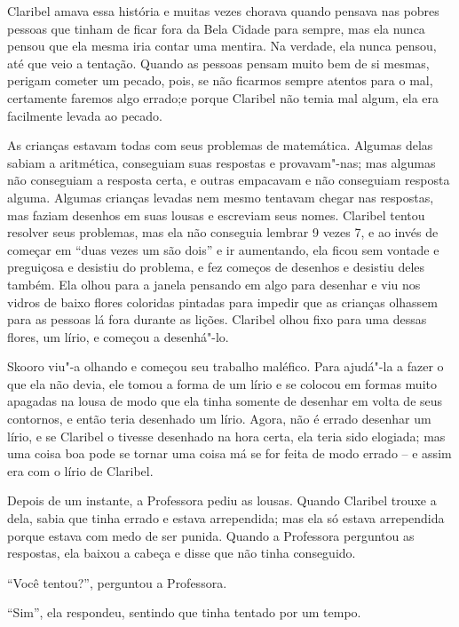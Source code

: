 Claribel amava essa história e muitas vezes chorava quando pensava nas
pobres pessoas que tinham de ficar fora da Bela Cidade para sempre, mas
ela nunca pensou que ela mesma iria contar uma mentira. Na verdade, ela
nunca pensou, até que veio a tentação. Quando as pessoas pensam muito
bem de si mesmas, perigam cometer um pecado, pois, se não ficarmos
sempre atentos para o mal, certamente faremos algo errado;e porque
Claribel não temia mal algum, ela era facilmente levada ao pecado.

As crianças estavam todas com seus problemas de matemática. Algumas
delas sabiam a aritmética, conseguiam suas respostas e provavam"-nas; mas
algumas não conseguiam a resposta certa, e outras empacavam e não
conseguiam resposta alguma. Algumas crianças levadas nem mesmo tentavam
chegar nas respostas, mas faziam desenhos em suas lousas e escreviam
seus nomes. Claribel tentou resolver seus problemas, mas ela não
conseguia lembrar 9 vezes 7, e ao invés de começar em ``duas vezes um
são dois'' e ir aumentando, ela ficou sem vontade e preguiçosa e
desistiu do problema, e fez começos de desenhos e desistiu deles também.
Ela olhou para a janela pensando em algo para desenhar e viu nos vidros
de baixo flores coloridas pintadas para impedir que as crianças olhassem
para as pessoas lá fora durante as lições. Claribel olhou fixo para uma
dessas flores, um lírio, e começou a desenhá"-lo.



Skooro viu"-a olhando e começou seu trabalho maléfico. Para ajudá"-la a
fazer o que ela não devia, ele tomou a forma de um lírio e se colocou em
formas muito apagadas na lousa de modo que ela tinha somente de desenhar
em volta de seus contornos, e então teria desenhado um lírio. Agora, não
é errado desenhar um lírio, e se Claribel o tivesse desenhado na hora
certa, ela teria sido elogiada; mas uma coisa boa pode se tornar uma
coisa má se for feita de modo errado -- e assim era com o lírio de
Claribel.

Depois de um instante, a Professora pediu as lousas. Quando Claribel
trouxe a dela, sabia que tinha errado e estava arrependida; mas ela só
estava arrependida porque estava com medo de ser punida. Quando a
Professora perguntou as respostas, ela baixou a cabeça e disse que não
tinha conseguido.

``Você tentou?'', perguntou a Professora.

``Sim'', ela respondeu, sentindo que tinha tentado por um tempo.

